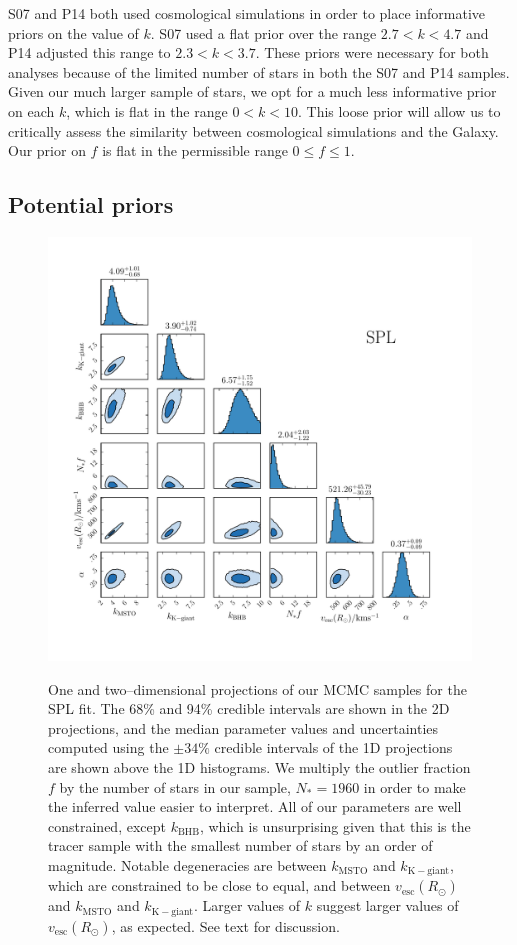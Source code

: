 \documentclass[useAMS,twocolumn,usenatbib]{mn2e}
\def\vesc{{v_\mathrm{esc}}}
\begin{document}
S07 and P14 both used cosmological simulations in order to place informative priors on the value of $k$. 
S07 used a flat prior over the range $2.7 < k < 4.7$ and P14 adjusted this range to $2.3 < k < 3.7$. 
These priors were necessary for both analyses because of the limited number of stars in both the S07 and P14 samples. 
Given our much larger sample of stars, we opt for a much less informative prior on each $k$, which is flat in the range $0 < k < 10$. 
This loose prior will allow us to critically assess the similarity between cosmological simulations and the Galaxy. 
Our prior on $f$ is flat in the permissible range $0 \leq f \leq 1$.

\subsection{Potential priors}

\begin{figure}
\includegraphics[width=2\columnwidth]{plots/big_corner_spherical_powerlaw}\\
\caption{One and two--dimensional projections of our MCMC samples for the SPL fit. 
The 68\% and 94\% credible intervals are shown in the 2D projections, and the median parameter values and uncertainties computed using the $\pm 34\%$ credible intervals of the 1D projections are shown above the 1D histograms. 
We multiply the outlier fraction $f$ by the number of stars in our sample, $N_*=1960$ in order to make the inferred value easier to interpret.
All of our parameters are well constrained, except $k_\mathrm{BHB}$, which is unsurprising given that this is the tracer sample with the smallest number of stars by an order of magnitude. 
Notable degeneracies are between $k_\mathrm{MSTO}$ and $k_\mathrm{K-giant}$, which are constrained to be close to equal, {} and between $\vesc(R_\odot)$ and $k_\mathrm{MSTO}$ and $k_\mathrm{K-giant}$. 
Larger values of $k$ suggest larger values of $\vesc(R_\odot)$, as expected. 
See text for discussion.}
\label{fig:SPL_corner}
\end{figure}
\end{document}
